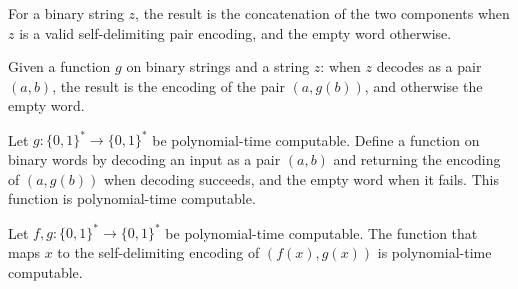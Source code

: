 \begin{definition}
\label{Complexity.a3n_concat}
\leanok
{}
For a binary string $z$, the result is the concatenation of the two components when $z$ is a valid self-delimiting pair encoding, and the empty word otherwise.
\end{definition}

\begin{definition}
\label{Complexity.a3n_map}
\leanok
{}
Given a function $g$ on binary strings and a string $z$: when $z$ decodes as a pair $(a, b)$, the result is the encoding of the pair $(a, g(b))$, and otherwise the empty word.
\end{definition}

\begin{lemma}
\label{Complexity.a3n_poly_map}
\leanok
{}
Let $g : \{0,1\}^* \to \{0,1\}^*$ be polynomial-time computable. Define a function on
binary words by decoding an input as a pair $(a,b)$ and returning the encoding of
$(a,g(b))$ when decoding succeeds, and the empty word when it fails. This function is
polynomial-time computable.
\end{lemma}

\begin{lemma}
\label{Complexity.a3n_poly_pair}
\leanok
{}
Let $f,g : \{0,1\}^* \to \{0,1\}^*$ be polynomial-time computable. The function that
maps $x$ to the self-delimiting encoding of $(f(x),g(x))$ is polynomial-time computable.
\end{lemma}

